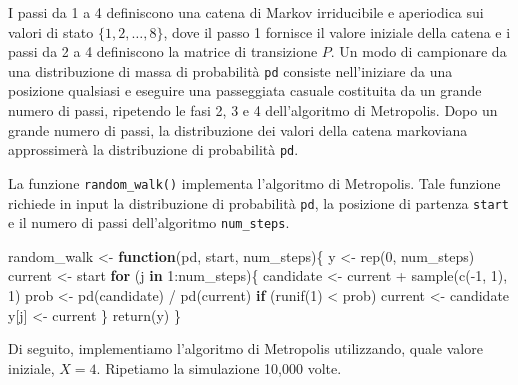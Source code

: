 \documentclass[
]{memoir}
\newenvironment{Shaded}{\begin{snugshade}}{\end{snugshade}}
\newcommand{\ControlFlowTok}[1]{\textcolor[rgb]{0.13,0.29,0.53}{\textbf{#1}}}
\newcommand{\DecValTok}[1]{\textcolor[rgb]{0.00,0.00,0.81}{#1}}
\newcommand{\FunctionTok}[1]{\textcolor[rgb]{0.00,0.00,0.00}{#1}}
\newcommand{\NormalTok}[1]{#1}
\newcommand{\OtherTok}[1]{\textcolor[rgb]{0.56,0.35,0.01}{#1}}
\newcommand{\SpecialCharTok}[1]{\textcolor[rgb]{0.00,0.00,0.00}{#1}}
\begin{document}
\bigskip

I passi da 1 a 4 definiscono una catena di Markov irriducibile e aperiodica sui valori di stato \(\{1, 2,\dots, 8\}\), dove il passo 1 fornisce il valore iniziale della catena e i passi da 2 a 4 definiscono la matrice di transizione \(P\). Un modo di campionare da una distribuzione di massa di probabilità \texttt{pd} consiste nell'iniziare da una posizione qualsiasi e eseguire una passeggiata casuale costituita da un grande numero di passi, ripetendo le fasi 2, 3 e 4 dell'algoritmo di Metropolis. Dopo un grande numero di passi, la distribuzione dei valori della catena markoviana approssimerà la distribuzione di probabilità \texttt{pd}.

La funzione \texttt{random\_walk()} implementa l'algoritmo di Metropolis. Tale funzione richiede in input la distribuzione di probabilità \texttt{pd}, la posizione di partenza \texttt{start} e il numero di passi dell'algoritmo \texttt{num\_steps}.

\begin{Shaded}
\begin{Highlighting}[]
\NormalTok{random\_walk }\OtherTok{\textless{}{-}} \ControlFlowTok{function}\NormalTok{(pd, start, num\_steps)\{}
\NormalTok{  y }\OtherTok{\textless{}{-}} \FunctionTok{rep}\NormalTok{(}\DecValTok{0}\NormalTok{, num\_steps)}
\NormalTok{  current }\OtherTok{\textless{}{-}}\NormalTok{ start}
  \ControlFlowTok{for}\NormalTok{ (j }\ControlFlowTok{in} \DecValTok{1}\SpecialCharTok{:}\NormalTok{num\_steps)\{}
\NormalTok{    candidate }\OtherTok{\textless{}{-}}\NormalTok{ current }\SpecialCharTok{+} \FunctionTok{sample}\NormalTok{(}\FunctionTok{c}\NormalTok{(}\SpecialCharTok{{-}}\DecValTok{1}\NormalTok{, }\DecValTok{1}\NormalTok{), }\DecValTok{1}\NormalTok{)}
\NormalTok{    prob }\OtherTok{\textless{}{-}} \FunctionTok{pd}\NormalTok{(candidate) }\SpecialCharTok{/} \FunctionTok{pd}\NormalTok{(current)}
    \ControlFlowTok{if}\NormalTok{ (}\FunctionTok{runif}\NormalTok{(}\DecValTok{1}\NormalTok{) }\SpecialCharTok{\textless{}}\NormalTok{ prob)}
\NormalTok{      current }\OtherTok{\textless{}{-}}\NormalTok{ candidate}
\NormalTok{    y[j] }\OtherTok{\textless{}{-}}\NormalTok{ current}
\NormalTok{  \}}
  \FunctionTok{return}\NormalTok{(y)}
\NormalTok{\}}
\end{Highlighting}
\end{Shaded}

\noindent
Di seguito, implementiamo l'algoritmo di Metropolis utilizzando, quale valore iniziale, \(X=4\). Ripetiamo la simulazione 10,000 volte.
\end{document}
